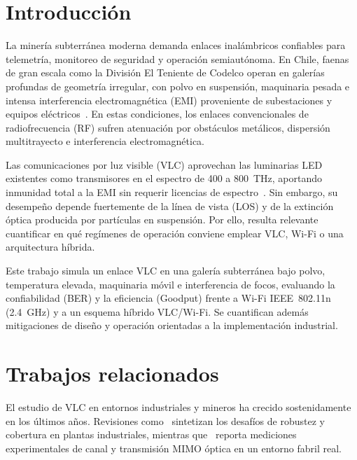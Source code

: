 \documentclass[conference]{IEEEtran}
\begin{document}
\section{Introducción}
La minería subterránea moderna demanda enlaces inalámbricos confiables para telemetría, monitoreo de seguridad y operación semiautónoma. En Chile, faenas de gran escala como la División El Teniente de Codelco operan en galerías profundas de geometría irregular, con polvo en suspensión, maquinaria pesada e intensa interferencia electromagnética (EMI) proveniente de subestaciones y equipos eléctricos~\cite{palacios2020}. En estas condiciones, los enlaces convencionales de radiofrecuencia (RF) sufren atenuación por obstáculos metálicos, dispersión multitrayecto e interferencia electromagnética.

Las comunicaciones por luz visible (VLC) aprovechan las luminarias LED existentes como transmisores en el espectro de 400 a 800~THz, aportando inmunidad total a la EMI sin requerir licencias de espectro~\cite{palacios2020,almadani2020}. Sin embargo, su desempeño depende fuertemente de la línea de vista (LOS) y de la extinción óptica producida por partículas en suspensión. Por ello, resulta relevante cuantificar en qué regímenes de operación conviene emplear VLC, Wi-Fi o una arquitectura híbrida.

Este trabajo simula un enlace VLC en una galería subterránea bajo polvo, temperatura elevada, maquinaria móvil e interferencia de focos, evaluando la confiabilidad (BER) y la eficiencia (Goodput) frente a Wi-Fi IEEE~802.11n (2.4~GHz) y a un esquema híbrido VLC/Wi-Fi. Se cuantifican además mitigaciones de diseño y operación orientadas a la implementación industrial.

\section{Trabajos relacionados}
El estudio de VLC en entornos industriales y mineros ha crecido sostenidamente en los últimos años. Revisiones como~\cite{almadani2020} sintetizan los desafíos de robustez y cobertura en plantas industriales, mientras que~\cite{berenguer2018} reporta mediciones experimentales de canal y transmisión MIMO óptica en un entorno fabril real.
\end{document}
